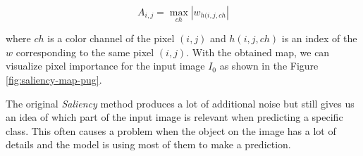 \begin{equation}
A_{i,j} = \max _{ch}|w_{h(i,j,ch}|
\label{eq:saliency-rgb-map-generation}
\end{equation}

where $ch$ is a color channel of the pixel $(i,j)$ and $h(i,j,ch)$ is an index of the $w$ corresponding to the same pixel $(i,j)$. With the obtained map, we can visualize pixel importance for the input image $I_0$ as shown in the Figure \ref{fig:saliency-map-pug}.

\vspace{\baselineskip}

The original \textit{Saliency} method produces a lot of additional noise but still gives us an idea of which part of the input image is relevant when predicting a specific class. This often causes a problem when the object on the image has a lot of details and the model is using most of them to make a prediction.
